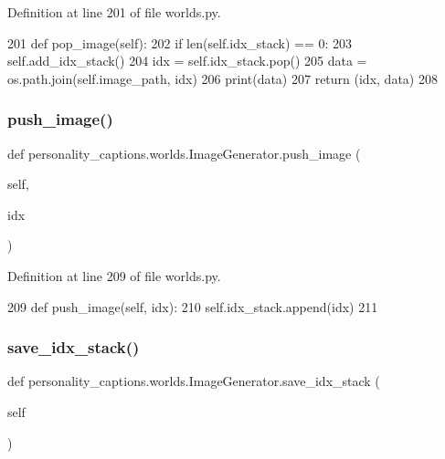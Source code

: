 Definition at line 201 of file worlds.\+py.


\begin{DoxyCode}
201     \textcolor{keyword}{def }pop\_image(self):
202         \textcolor{keywordflow}{if} len(self.idx\_stack) == 0:
203             self.add\_idx\_stack()
204         idx = self.idx\_stack.pop()
205         data = os.path.join(self.image\_path, idx)
206         print(data)
207         \textcolor{keywordflow}{return} (idx, data)
208 
\end{DoxyCode}
\mbox{\label{classpersonality__captions_1_1worlds_1_1ImageGenerator_a78705bbcfdb530dc94ff25cc0aa7fd65}} 
\subsubsection{\texorpdfstring{push\+\_\+image()}{push\_image()}}
{\footnotesize\ttfamily def personality\+\_\+captions.\+worlds.\+Image\+Generator.\+push\+\_\+image (\begin{DoxyParamCaption}\item[{}]{self,  }\item[{}]{idx }\end{DoxyParamCaption})}



Definition at line 209 of file worlds.\+py.


\begin{DoxyCode}
209     \textcolor{keyword}{def }push\_image(self, idx):
210         self.idx\_stack.append(idx)
211 
\end{DoxyCode}
\mbox{\label{classpersonality__captions_1_1worlds_1_1ImageGenerator_a1a62516fa0aad79a400d8824f7353d42}} 
\subsubsection{\texorpdfstring{save\+\_\+idx\+\_\+stack()}{save\_idx\_stack()}}
{\footnotesize\ttfamily def personality\+\_\+captions.\+worlds.\+Image\+Generator.\+save\+\_\+idx\+\_\+stack (\begin{DoxyParamCaption}\item[{}]{self }\end{DoxyParamCaption})}



